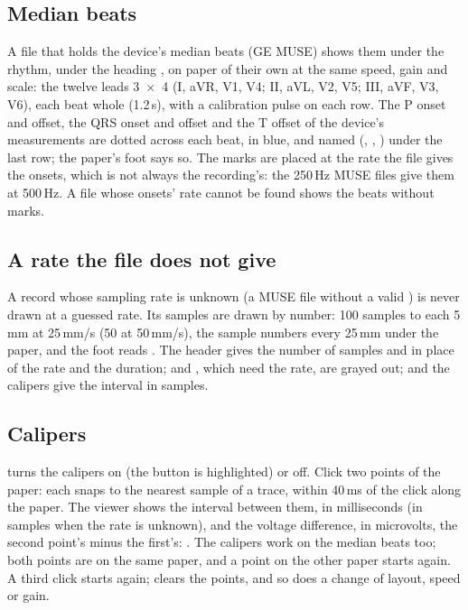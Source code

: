 \subsection{Median beats}
\label{sec:ecg-viewer-median}

A file that holds the device's median beats (GE MUSE) shows them under the rhythm, under the
heading , on paper of their own at the same speed, gain and scale: the twelve
leads 3~$\times$~4 (I, aVR, V1, V4; II, aVL, V2, V5; III, aVF, V3, V6), each beat whole
(1.2\,s), with a calibration pulse on each row. The P onset and offset, the QRS onset and offset
and the T offset of the device's measurements are dotted across each beat, in blue, and named
(, , ) under the last row; the paper's foot says so. The marks are
placed at the rate the file gives the onsets, which is not always the recording's: the 250\,Hz
MUSE files give them at 500\,Hz. A file whose onsets' rate cannot be found shows the beats
without marks.

\subsection{A rate the file does not give}
\label{sec:ecg-viewer-no-rate}

A record whose sampling rate is unknown (a MUSE file without a valid ) is never
drawn at a guessed rate. Its samples are drawn by number: 100 samples to each 5\,mm at 25\,mm/s
(50 at 50\,mm/s), the sample numbers every 25\,mm under the paper, and the foot reads
. The header gives the number of samples and
 in place of the rate and the duration;  and
, which need the rate, are grayed out; and the calipers give the interval in samples.

\subsection{Calipers}
\label{sec:ecg-viewer-calipers}

 turns the calipers on (the button is highlighted) or off. Click two points of the
paper: each snaps to the nearest sample of a trace, within 40\,ms of the click along the paper.
The viewer shows the interval between them, in milliseconds (in samples when the rate is
unknown), and the voltage difference, in microvolts, the second point's minus the first's:
. The calipers work on the median beats too; both points are on
the same paper, and a point on the other paper starts again. A third click starts again;
 clears the points, and so does a change of layout, speed or gain.


